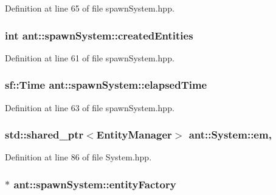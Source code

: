 Definition at line 65 of file spawn\+System.\+hpp.

\hypertarget{classant_1_1spawn_system_af01da0544d6bcd40342b87eff15f0e28}{
\subsubsection[{created\+Entities}]{\setlength{\rightskip}{0pt plus 5cm}int ant\+::spawn\+System\+::created\+Entities\hspace{0.3cm}{\ttfamily [private]}}}\label{classant_1_1spawn_system_af01da0544d6bcd40342b87eff15f0e28}


Definition at line 61 of file spawn\+System.\+hpp.

\hypertarget{classant_1_1spawn_system_ad9cfddea638866f36562f0c02bf7b789}{
\subsubsection[{elapsed\+Time}]{\setlength{\rightskip}{0pt plus 5cm}sf\+::\+Time ant\+::spawn\+System\+::elapsed\+Time\hspace{0.3cm}{\ttfamily [private]}}}\label{classant_1_1spawn_system_ad9cfddea638866f36562f0c02bf7b789}


Definition at line 63 of file spawn\+System.\+hpp.

\hypertarget{classant_1_1_system_a5661d872ff769be150bd4e9a9552f6b9}{
\subsubsection[{em}]{\setlength{\rightskip}{0pt plus 5cm}std\+::shared\+\_\+ptr$<${\bf Entity\+Manager}$>$ ant\+::\+System\+::em\hspace{0.3cm}{\ttfamily [protected]}, {\ttfamily [inherited]}}}\label{classant_1_1_system_a5661d872ff769be150bd4e9a9552f6b9}


Definition at line 86 of file System.\+hpp.

\hypertarget{classant_1_1spawn_system_aa6597a6902da56181752851938ce8356}{
\subsubsection[{entity\+Factory}]{$\ast$ ant\+::spawn\+System\+::entity\+Factory\hspace{0.3cm}{\ttfamily [private]}}}\label{classant_1_1spawn_system_aa6597a6902da56181752851938ce8356}


